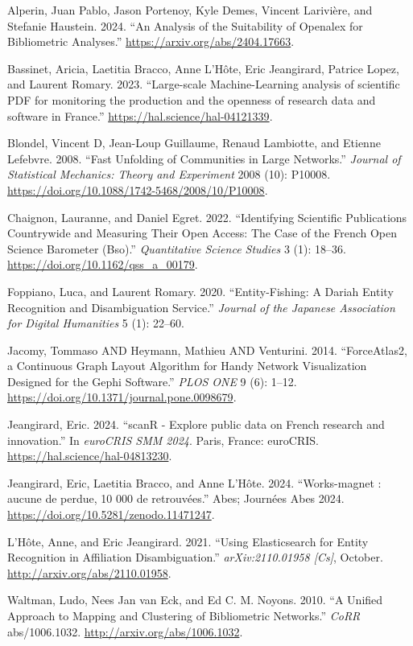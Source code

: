 \documentclass[
]{article}
\newlength{\cslhangindent}
\newenvironment{cslreferences}%
  {\setlength{\parindent}{0pt}%
  \everypar{\setlength{\hangindent}{\cslhangindent}}\ignorespaces}%
  {\par}
\begin{document}
\hypertarget{refs}{}
\begin{cslreferences}
\leavevmode\hypertarget{ref-alperin2024analysissuitabilityopenalexbibliometric}{}%
Alperin, Juan Pablo, Jason Portenoy, Kyle Demes, Vincent Larivière, and
Stefanie Haustein. 2024. ``An Analysis of the Suitability of Openalex
for Bibliometric Analyses.'' \url{https://arxiv.org/abs/2404.17663}.

\leavevmode\hypertarget{ref-bassinet:hal-04121339}{}%
Bassinet, Aricia, Laetitia Bracco, Anne L'Hôte, Eric Jeangirard, Patrice
Lopez, and Laurent Romary. 2023. ``Large-scale Machine-Learning analysis
of scientific PDF for monitoring the production and the openness of
research data and software in France.''
\url{https://hal.science/hal-04121339}.

\leavevmode\hypertarget{ref-Blondel_2008}{}%
Blondel, Vincent D, Jean-Loup Guillaume, Renaud Lambiotte, and Etienne
Lefebvre. 2008. ``Fast Unfolding of Communities in Large Networks.''
\emph{Journal of Statistical Mechanics: Theory and Experiment} 2008
(10): P10008. \url{https://doi.org/10.1088/1742-5468/2008/10/P10008}.

\leavevmode\hypertarget{ref-10.1162ux2fqss_a_00179}{}%
Chaignon, Lauranne, and Daniel Egret. 2022. ``Identifying Scientific
Publications Countrywide and Measuring Their Open Access: The Case of
the French Open Science Barometer (Bso).'' \emph{Quantitative Science
Studies} 3 (1): 18--36. \url{https://doi.org/10.1162/qss_a_00179}.

\leavevmode\hypertarget{ref-foppiano2020entity}{}%
Foppiano, Luca, and Laurent Romary. 2020. ``Entity-Fishing: A Dariah
Entity Recognition and Disambiguation Service.'' \emph{Journal of the
Japanese Association for Digital Humanities} 5 (1): 22--60.

\leavevmode\hypertarget{ref-10.1371ux2fjournal.pone.0098679}{}%
Jacomy, Tommaso AND Heymann, Mathieu AND Venturini. 2014. ``ForceAtlas2,
a Continuous Graph Layout Algorithm for Handy Network Visualization
Designed for the Gephi Software.'' \emph{PLOS ONE} 9 (6): 1--12.
\url{https://doi.org/10.1371/journal.pone.0098679}.

\leavevmode\hypertarget{ref-jeangirard:hal-04813230}{}%
Jeangirard, Eric. 2024. ``scanR - Explore public data on French research
and innovation.'' In \emph{euroCRIS SMM 2024}. Paris, France: euroCRIS.
\url{https://hal.science/hal-04813230}.

\leavevmode\hypertarget{ref-jeangirard:hal-04598201}{}%
Jeangirard, Eric, Laetitia Bracco, and Anne L'Hôte. 2024. ``Works-magnet
: aucune de perdue, 10 000 de retrouvées.'' Abes; Journées Abes 2024.
\url{https://doi.org/10.5281/zenodo.11471247}.

\leavevmode\hypertarget{ref-lhote_using_2021}{}%
L'Hôte, Anne, and Eric Jeangirard. 2021. ``Using Elasticsearch for
Entity Recognition in Affiliation Disambiguation.''
\emph{arXiv:2110.01958 {[}Cs{]}}, October.
\url{http://arxiv.org/abs/2110.01958}.

\leavevmode\hypertarget{ref-DBLP:journalsux2fcorrux2fabs-1006-1032}{}%
Waltman, Ludo, Nees Jan van Eck, and Ed C. M. Noyons. 2010. ``A Unified
Approach to Mapping and Clustering of Bibliometric Networks.''
\emph{CoRR} abs/1006.1032. \url{http://arxiv.org/abs/1006.1032}.
\end{cslreferences}
\end{document}
